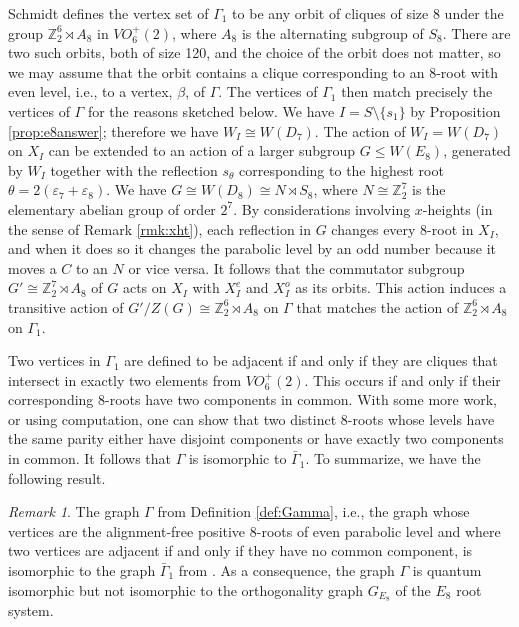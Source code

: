 \documentclass[11pt]{amsart}
\theoremstyle{plain}
\theoremstyle{definition}
\theoremstyle{remark}
\newtheorem{rmk}[theorem]{Remark}
\numberwithin{equation}{subsection}
\newcommand{\ep}{\varepsilon}
\newcommand{\Z}{{\mathbb Z}}
\begin{document}
Schmidt defines the vertex set of $\Gamma_1$ to be any orbit of cliques of size
8 under the group $\Z_2^6\rtimes A_8$ in $VO_6^+(2)$, where $A_8$ is the
alternating subgroup of $S_8$. There are two such orbits, both of size 120, and
the choice of the orbit does not matter, so we may assume that the orbit
contains a clique corresponding to an 8-root with even level, i.e., to a vertex,
$\beta$, of $\Gamma$. The vertices of $\Gamma_1$ then match precisely the
vertices of $\Gamma$ for the reasons sketched below. We have
$I=S\setminus\{s_1\}$ by Proposition \ref{prop:e8answer}; therefore we have
$W_I\cong W(D_7)$. The action of $W_I = W(D_7)$ on $X_I$ can be extended to an
action of a larger subgroup $G \leq W(E_8)$, generated by $W_I$ together with
the reflection $s_\theta$ corresponding to the highest root
$\theta=2(\ep_7+\ep_8)$.  We have $G \cong W(D_8) \cong N \rtimes S_8$, where $N
\cong \Z_2^7$ is the elementary abelian group of order $2^7$. By considerations
involving $x$-heights (in the sense of Remark \ref{rmk:xht}), each reflection in
$G$ changes every 8-root in $X_I$, and when it does so it changes the parabolic
level by an odd number because it moves a $C$ to an $N$ or vice versa.  It
follows that the commutator subgroup $G'\cong \Z_2^7\rtimes A_8$ of $G$ acts on
$X_I$ with $X_I^{e}$ and $X_I^{o}$ as its orbits.  This action induces a
transitive action of $G'/Z(G) \cong \Z_2^6\rtimes A_8$ on $\Gamma$ that matches
the action of $\Z_2^6\rtimes A_8$ on $\Gamma_1$.

Two vertices in $\Gamma_1$ are defined to be adjacent if and only if they are
cliques that intersect in exactly two elements from $VO_6^+(2)$. This occurs if
and only if their corresponding $8$-roots have two components in common. With
some more work, or using computation, one can show that two distinct 8-roots
whose levels have the same parity either have disjoint components or have
exactly two components in common. It follows that $\Gamma$ is isomorphic to
$\bar\Gamma_1$. To summarize, we have the following result.

\begin{rmk}
\label{rmk:quantumiso}
The graph $\Gamma$ from Definition \ref{def:Gamma}, i.e., the graph whose
vertices are the alignment-free positive $8$-roots of even parabolic level and
where two vertices are adjacent if and only if they have no common component, is
isomorphic to the graph $\bar\Gamma_1$ from \cite{schmidt24}. As a consequence,
the graph $\Gamma$ is quantum isomorphic but not isomorphic to the orthogonality
graph $G_{E_8}$ of the $E_8$ root system.
\end{rmk}
\end{document}
